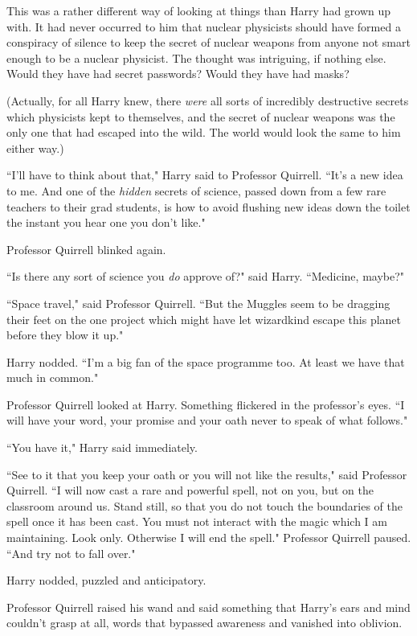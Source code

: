 This was a rather different way of looking at things than Harry had grown up with. It had never occurred to him that nuclear physicists should have formed a conspiracy of silence to keep the secret of nuclear weapons from anyone not smart enough to be a nuclear physicist. The thought was intriguing, if nothing else. Would they have had secret passwords? Would they have had masks?

(Actually, for all Harry knew, there \emph{were} all sorts of incredibly destructive secrets which physicists kept to themselves, and the secret of nuclear weapons was the only one that had escaped into the wild. The world would look the same to him either way.)

``I'll have to think about that," Harry said to Professor Quirrell. ``It's a new idea to me. And one of the \emph{hidden} secrets of science, passed down from a few rare teachers to their grad students, is how to avoid flushing new ideas down the toilet the instant you hear one you don't like."

Professor Quirrell blinked again.

``Is there any sort of science you \emph{do} approve of?" said Harry. ``Medicine, maybe?"

``Space travel," said Professor Quirrell. ``But the Muggles seem to be dragging their feet on the one project which might have let wizardkind escape this planet before they blow it up."

Harry nodded. ``I'm a big fan of the space programme too. At least we have that much in common."

Professor Quirrell looked at Harry. Something flickered in the professor's eyes. ``I will have your word, your promise and your oath never to speak of what follows."

``You have it," Harry said immediately.

``See to it that you keep your oath or you will not like the results," said Professor Quirrell. ``I will now cast a rare and powerful spell, not on you, but on the classroom around us. Stand still, so that you do not touch the boundaries of the spell once it has been cast. You must not interact with the magic which I am maintaining. Look only. Otherwise I will end the spell." Professor Quirrell paused. ``And try not to fall over."

Harry nodded, puzzled and anticipatory.

Professor Quirrell raised his wand and said something that Harry's ears and mind couldn't grasp at all, words that bypassed awareness and vanished into oblivion.


